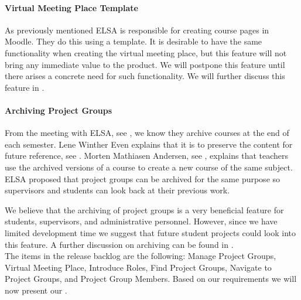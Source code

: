 \paragraph{Virtual Meeting Place Template}
As previously mentioned ELSA is responsible for creating course pages in Moodle. 
They do this using a template. 
It is desirable to have the same functionality when creating the virtual meeting place, but this feature will not bring any immediate value to the product. 
We will postpone this feature until there arises a concrete need for such functionality.
We will further discuss this feature in \secref{}.

\paragraph{Archiving Project Groups}
\label{sub:analysarchiving}
From the meeting with ELSA, see , we know they archive courses at the end of each semester. 
Lene Winther Even explains that it is to preserve the content for future reference, see . 
Morten Mathiasen Andersen, see , explains that teachers use the archived versions of a course to create a new course of the same subject. 
ELSA proposed that project groups can be archived for the same purpose so supervisors and students can look back at their previous work.

We believe that the archiving of project groups is a very beneficial feature for students, supervisors, and administrative personnel.
However, since we have limited development time we suggest that future student projects could look into this feature.
A further discussion on archiving can be found in .\\

The items in the release backlog are the following: Manage Project Groups, Virtual Meeting Place, Introduce Roles, Find Project Groups, Navigate to Project Groups, and Project Group Members. 
Based on our requirements we will now present our .

